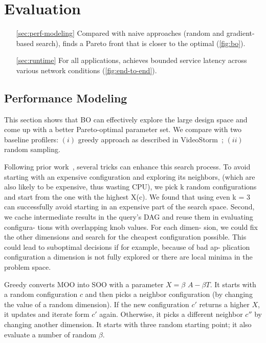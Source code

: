 \section{Evaluation}
\label{sec:evaluation}

\begin{itemize}[itemsep=0pt, topsep=1pt]
\item[\autoref{sec:perf-modeling}] Compared with naive approaches (random and
  gradient-based search), \sysname{} finds a Pareto front that is closer to the
  optimal (\autoref{fig:bo}).
\item[\autoref{sec:runtime}] For all applications, \sysname{} achieves bounded
  service latency across various network conditions (\autoref{fig:end-to-end}).
\end{itemize}

\subsection{Performance Modeling}
\label{sec:perf-modeling}

This section shows that BO can effectively explore the large design space and
come up with a better Pareto-optimal parameter set. We compare \sysname{} with
two baseline profilers: $(i)$ greedy approach as described in
VideoStorm~\cite{zhang2017live}; $(ii)$ random sampling.

Following prior work~\cite{zhang2017live}, several tricks can enhance this
search process. To avoid starting with an expensive configuration and exploring
its neighbors, (which are also likely to be expensive, thus wasting CPU), we
pick k random configurations and start from the one with the highest X(c). We
found that using even k = 3 can successfully avoid starting in an expensive part
of the search space. Second, we cache intermediate results in the query’s DAG
and reuse them in evaluating configura- tions with overlapping knob values. For
each dimen- sion, we could fix the other dimensions and search for the cheapest
configuration possible. This could lead to suboptimal decisions if for example,
because of bad ap- plication configuration a dimension is not fully explored or
there are local minima in the problem space.


Greedy converts MOO into SOO with a parameter $X = \beta$ $A - \beta T$. It
starts with a random configuration $c$ and then picks a neighbor configuration
(by changing the value of a random dimension). If the new configuration $c'$
returns a higher $X$, it updates and iterate form $c'$ again. Otherwise, it
picks a different neighbor $c''$ by changing another dimension. It starts with
three random starting point; it also evaluate a number of random $\beta$.

